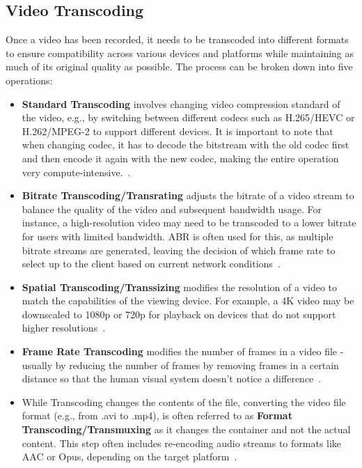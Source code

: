 \subsection{Video Transcoding}
Once a video has been recorded, it needs to be transcoded into different formats to ensure compatibility across various devices and platforms while maintaining as much of its original quality as possible. The process can be broken down into five operations:

\begin{itemize}
    \item \textbf{Standard Transcoding} involves changing video compression standard of the video, e.g., by switching between different codecs such as H.265/HEVC or H.262/MPEG-2 to support different devices. It is important to note that when changing codec, it has to decode the bitstream with the old codec first and then encode it again with the new codec, making the entire operation very compute-intensive.~\parencite{codec_transcoding}.
    \item \textbf{Bitrate Transcoding/Transrating} adjusts the bitrate of a video stream to balance the quality of the video and subsequent bandwidth usage. For instance, a high-resolution video may need to be transcoded to a lower bitrate for users with limited bandwidth. \ac{ABR} is often used for this, as multiple bitrate streams are generated, leaving the decision of which frame rate to select up to the client based on current network conditions~\parencite{transcoding}.
    \item \textbf{Spatial Transcoding/Transsizing} modifies the resolution of a video to match the capabilities of the viewing device. For example, a 4K video may be downscaled to 1080p or 720p for playback on devices that do not support higher resolutions~\parencite{cloud_streaming}.
    \item \textbf{Frame Rate Transcoding} modifies the number of frames in a video file - usually by reducing the number of frames by removing frames in a certain distance so that the human visual system doesn't notice a difference~\parencite{transcoding}.
    \item While Transcoding changes the contents of the file, converting the video file format (e.g., from .avi to .mp4), is often referred to as \textbf{Format Transcoding/Transmuxing} as it changes the container and not the actual content. This step often includes re-encoding audio streams to formats like AAC or Opus, depending on the target platform~\parencite{transcoding}.
\end{itemize}

